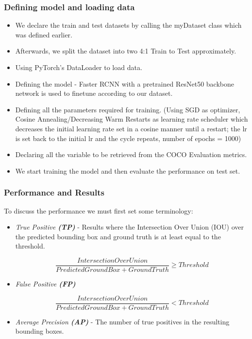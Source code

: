 \documentclass[12pt, landscape]{article}
\begin{document}
\begin{multicols}{3}
\subsubsection{Defining model and loading data}
\begin{itemize}
    \item We declare the train and test datasets by calling the myDataset class
    which was defined earlier.
    \item Afterwards, we split the dataset into two 4:1 Train to Test approximately.
    \item Using PyTorch's DataLoader to load data.
    \item Defining the model - Faster RCNN with a pretrained ResNet50 backbone
    network is used to finetune according to our dataset.
    \item Defining all the parameters required for training. (Using SGD as
    optimizer, Cosine Annealing/Decreasing Warm Restarts as learning rate
    scheduler which decreases the initial learning rate set in a cosine manner
    until a restart; the lr is set back to the initial lr and the cycle repeats,
    number of epochs = 1000)
    \item Declaring all the variable to be retrieved from the COCO Evaluation
    metrics.
    \item We start training the model and then evaluate the performance on test
    set.
\end{itemize}

\subsubsection{Performance and Results}
To discuss the performance we must first set some terminology:
\begin{itemize}
    \item \emph{True Positive \textbf{(TP)}} - Results where the Intersection
    Over Union (IOU) over the predicted bounding box and ground truth is at
    least equal to the threshold.

    \[\frac{Intersection Over Union}{Predicted Ground Box+Ground Truth} \geq
    Threshold\]

    \item \emph{False Positive \textbf{(FP)}}

    \[\frac{Intersection Over Union}{Predicted Ground Box+Ground Truth} <
    Threshold\]

    \item \emph{Average Precision \textbf{(AP)}} - The number of true positives
    in the resulting bounding boxes.


\end{itemize}
\end{multicols}
\end{document}
